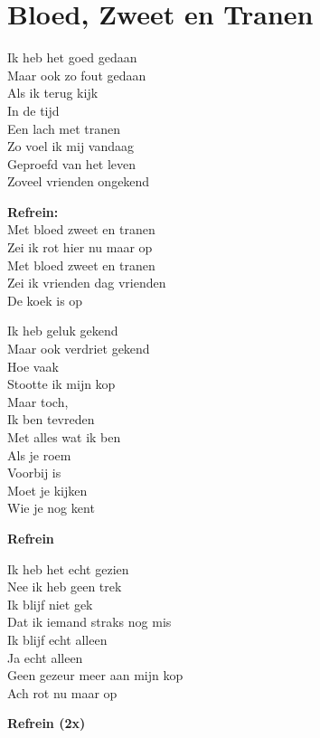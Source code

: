 \section{Bloed, Zweet en Tranen}
Ik heb het goed gedaan\\
Maar ook zo fout gedaan\\
Als ik terug kijk\\
In de tijd\\
Een lach met tranen\\
Zo voel ik mij vandaag\\
Geproefd van het leven\\
Zoveel vrienden ongekend

\textbf{Refrein:}\\
Met bloed zweet en tranen\\
Zei ik rot hier nu maar op\\
Met bloed zweet en tranen\\
Zei ik vrienden dag vrienden\\
De koek is op

Ik heb geluk gekend\\
Maar ook verdriet gekend\\
Hoe vaak\\
Stootte ik mijn kop\\
Maar toch,\\
Ik ben tevreden\\
Met alles wat ik ben\\
Als je roem\\
Voorbij is\\
Moet je kijken\\
Wie je nog kent

\textbf{Refrein}

Ik heb het echt gezien\\
Nee ik heb geen trek\\
Ik blijf niet gek\\
Dat ik iemand straks nog mis\\
Ik blijf echt alleen\\
Ja echt alleen\\
Geen gezeur meer aan mijn kop\\
Ach rot nu maar op

\textbf{Refrein (2x)}
